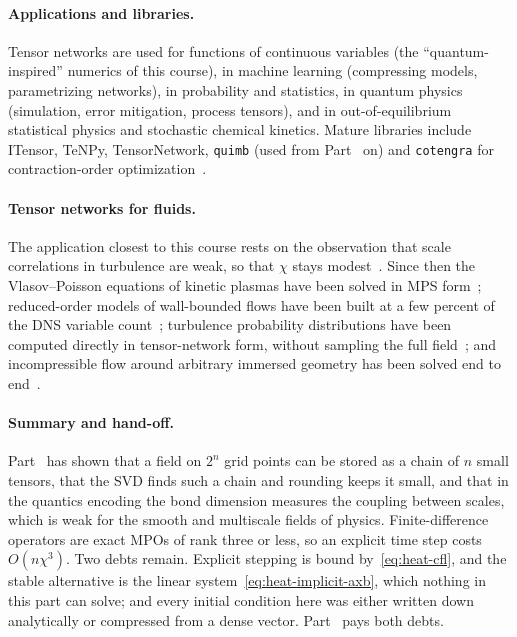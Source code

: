 \paragraph{Applications and libraries.}
Tensor networks are used for functions of continuous variables (the
\enquote{quantum-inspired} numerics of this course), in machine learning
(compressing models, parametrizing networks), in probability and statistics, in
quantum physics (simulation, error mitigation, process tensors), and in
out-of-equilibrium statistical physics and stochastic chemical kinetics.
Mature libraries include ITensor, TeNPy, TensorNetwork, \texttt{quimb} (used
from Part~ on) and \texttt{cotengra} for contraction-order
optimization~\cite{Gray2021}.

\paragraph{Tensor networks for fluids.}
The application closest to this course rests on the observation that scale
correlations in turbulence are weak, so that $\chi$ stays
modest~\cite{Gourianov2022}. Since then the Vlasov--Poisson equations of
kinetic plasmas have been solved in MPS form~\cite{Ye2022}; reduced-order
models of wall-bounded flows have been built at a few percent of the DNS
variable count~\cite{Kiffner2023}; turbulence probability distributions have
been computed directly in tensor-network form, without sampling the full
field~\cite{Gourianov2025}; and incompressible flow around arbitrary immersed
geometry has been solved end to end~\cite{Peddinti2024}.

\paragraph{Summary and hand-off.}
Part~ has shown that a field on $2^n$ grid points can be stored as a
chain of $n$ small tensors, that the SVD finds such a chain and rounding keeps
it small, and that in the quantics encoding the bond dimension measures the
coupling between scales, which is weak for the smooth and multiscale fields of
physics. Finite-difference operators are exact MPOs of rank three or less, so an
explicit time step costs $O(n\chi^3)$. Two debts remain. Explicit stepping is
bound by~\eqref{eq:heat-cfl}, and the stable alternative is the linear
system~\eqref{eq:heat-implicit-axb}, which nothing in this part can solve; and
every initial condition here was either written down analytically or compressed
from a dense vector. Part~ pays both debts.

